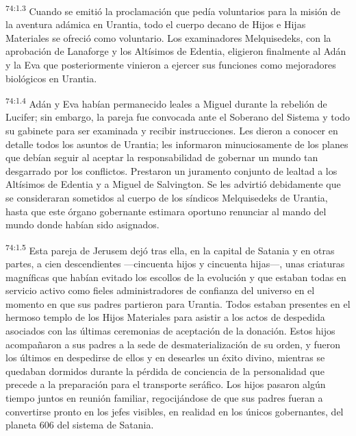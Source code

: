 \par
\textsuperscript{74:1.3} Cuando se emitió la proclamación que pedía voluntarios para la misión de la aventura adámica en Urantia, todo el cuerpo decano de Hijos e Hijas Materiales se ofreció como voluntario. Los examinadores Melquisedeks, con la aprobación de Lanaforge y los Altísimos de Edentia, eligieron finalmente al Adán y la Eva que posteriormente vinieron a ejercer sus funciones como mejoradores biológicos en Urantia.

\par
\textsuperscript{74:1.4} Adán y Eva habían permanecido leales a Miguel durante la rebelión de Lucifer; sin embargo, la pareja fue convocada ante el Soberano del Sistema y todo su gabinete para ser examinada y recibir instrucciones. Les dieron a conocer en detalle todos los asuntos de Urantia; les informaron minuciosamente de los planes que debían seguir al aceptar la responsabilidad de gobernar un mundo tan desgarrado por los conflictos. Prestaron un juramento conjunto de lealtad a los Altísimos de Edentia y a Miguel de Salvington. Se les advirtió debidamente que se consideraran sometidos al cuerpo de los síndicos Melquisedeks de Urantia, hasta que este órgano gobernante estimara oportuno renunciar al mando del mundo donde habían sido asignados.

\par
\textsuperscript{74:1.5} Esta pareja de Jerusem dejó tras ella, en la capital de Satania y en otras partes, a cien descendientes ---cincuenta hijos y cincuenta hijas---, unas criaturas magníficas que habían evitado los escollos de la evolución y que estaban todas en servicio activo como fieles administradores de confianza del universo en el momento en que sus padres partieron para Urantia. Todos estaban presentes en el hermoso templo de los Hijos Materiales para asistir a los actos de despedida asociados con las últimas ceremonias de aceptación de la donación. Estos hijos acompañaron a sus padres a la sede de desmaterialización de su orden, y fueron los últimos en despedirse de ellos y en desearles un éxito divino, mientras se quedaban dormidos durante la pérdida de conciencia de la personalidad que precede a la preparación para el transporte seráfico. Los hijos pasaron algún tiempo juntos en reunión familiar, regocijándose de que sus padres fueran a convertirse pronto en los jefes visibles, en realidad en los únicos gobernantes, del planeta 606 del sistema de Satania.

